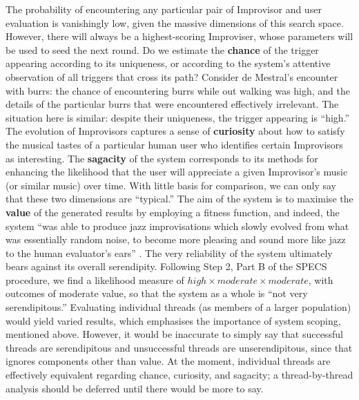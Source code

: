 The probability of encountering any particular pair of Improvisor and
user evaluation is vanishingly low, given the massive dimensions of
this search space.  However, there will always be a highest-scoring
Improviser, whose parameters will be used to seed the next round.  Do
we estimate the \textbf{chance} of the trigger appearing according to
its uniqueness, or according to the system's attentive observation of
all triggers that cross its path?  Consider de Mestral's encounter
with burrs: the chance of encountering burrs while out walking was
high, and the details of the particular burrs that were encountered
effectively irrelevant.  The situation here is similar: despite their
uniqueness, the trigger appearing is ``high.''  The evolution of
Improvisors captures a sense of \textbf{curiosity} about how to
satisfy the musical tastes of a particular human user who identifies
certain Improvisors as interesting.  The \textbf{sagacity} of the
system corresponds to its methods for enhancing the likelihood that
the user will appreciate a given Improvisor's music (or similar music)
over time.  With little basis for comparison, we can only say that
these two dimensions are ``typical.''  The aim of the system is to
maximise the \textbf{value} of the generated results by employing a
fitness function, and indeed, the system ``was able to produce jazz
improvisations which slowly evolved from what was essentially random
noise, to become more pleasing and sound more like jazz to the human
evaluator's ears'' \cite{jordanous10}.  The very reliability of the
system ultimately bears against its overall serendipity.  Following
Step 2, Part B of the SPECS procedure, we find a likelihood measure of
$\mathit{high}\times\mathit{moderate}\times\mathit{moderate}$, with
outcomes of moderate value, so that the system as a whole is ``not
very serendipitous.''  Evaluating individual threads (as members
of a larger population) would yield varied results, which
emphasises the importance of system scoping, mentioned above.
However, it would be inaccurate to simply say that successful threads are serendipitous and unsuccessful threads are unserendipitous,  since that ignores components other than value.  At the moment, individual threads are effectively equivalent regarding chance,
curiosity, and sagacity; a thread-by-thread analysis should be deferred until there would be more to say.

